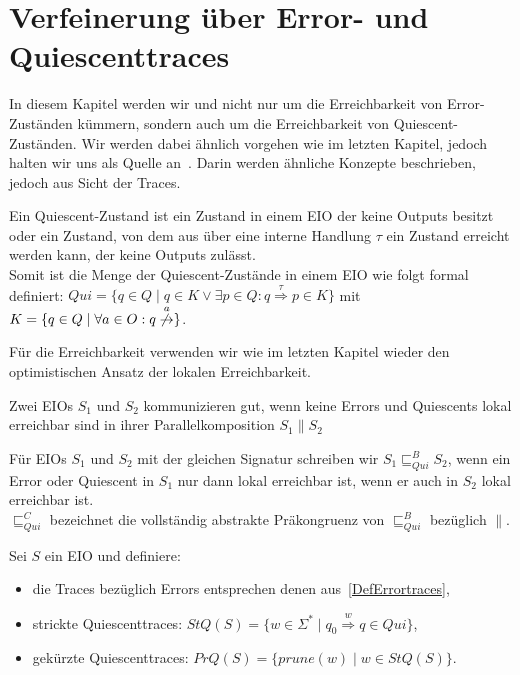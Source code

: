 \chapter{Verfeinerung über Error- und Quiescenttraces}

In diesem Kapitel werden wir und nicht nur um die Erreichbarkeit von
Error-Zuständen kümmern, sondern auch um die Erreichbarkeit von
Quiescent-Zuständen. Wir werden dabei ähnlich vorgehen wie im letzten Kapitel,
jedoch halten wir uns als Quelle an~\cite{Chilton2013}. Darin werden ähnliche Konzepte
beschrieben, jedoch aus Sicht der Traces.

\begin{Def}[Quiescent]
  Ein Quiescent-Zustand ist ein Zustand in einem EIO der keine Outputs besitzt
  oder ein Zustand, von dem aus über eine interne Handlung $\tau$ ein Zustand
  erreicht werden kann, der keine Outputs zulässt.\\
  Somit ist die Menge der Quiescent-Zustände in einem EIO wie folgt formal
  definiert: $Qui=\{q\in Q\mid q\in K\vee \exists p\in Q:
  q\overset{\tau}{\Rightarrow} p\in K\}$ mit $K=\{q\in Q\mid \forall a\in O:
  q\overset{a}{\not{\hspace{-0.1cm}\rightarrow}}\}$.
\end{Def}

Für die Erreichbarkeit verwenden wir wie im letzten Kapitel wieder den
optimistischen Ansatz der lokalen Erreichbarkeit.

\begin{Def}
  Zwei EIOs $S_1$ und $S_2$ kommunizieren gut, wenn keine Errors und Quiescents
  lokal erreichbar sind in ihrer Parallelkomposition $S_1\| S_2$
\end{Def}

\begin{Def}
  Für EIOs $S_1$ und $S_2$ mit der gleichen Signatur schreiben wir
  $S_1\sqsubseteq _{Qui}^B S_2$, wenn ein Error oder Quiescent in $S_1$ nur
  dann lokal erreichbar ist, wenn er auch in $S_2$ lokal erreichbar ist.\\
  $\sqsubseteq _{Qui}^C$ bezeichnet die vollständig abstrakte Präkongruenz von
  $\sqsubseteq  _{Qui}^ B$ bezüglich $\|$.
\end{Def}

\begin{Def}
  \label{DefQuiescenttraces}
  Sei $S$ ein EIO und definiere:
  \begin{itemize}
    \item die Traces bezüglich Errors entsprechen denen
      aus~\ref{DefErrortraces},
    \item strickte Quiescenttraces: $StQ(S) = \{w\in\Sigma ^*\mid q_0
      \overset{w}{\Rightarrow} q\in Qui\}$,
    \item gekürzte Quiescenttraces: $PrQ(S) = \{prune(w)\mid w\in StQ(S)\}$.
  \end{itemize}
\end{Def}

